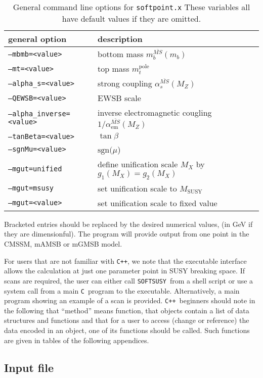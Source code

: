 \documentclass[]{article}
\def\SOFTSUSY{{\tt SOFTSUSY}}
\def\code#1{\small{\tt #1}\normalsize}
\begin{document}
\begin{table}[tbh]
  \centering
  \begin{tabular}{ll}
    general option & description \\
    \hline
    \code{--mbmb=<value>} & bottom mass $m_b^{\overline{MS}}(m_b)$ \\
    \code{--mt=<value>} & top mass $m_t^\text{pole}$ \\
    \code{--alpha\_s=<value>} & strong coupling $\alpha_s^{\overline{MS}}(M_Z)$ \\
    \code{--QEWSB=<value>} & EWSB scale \\
    \code{--alpha\_inverse=<value>} & inverse electromagnetic cougling
    $1/\alpha^{\overline{MS}}_\text{em}(M_Z)$ \\
    \code{--tanBeta=<value>} & $\tan\beta$ \\
    \code{--sgnMu=<value>} & $\text{sgn}(\mu$) \\
    \code{--mgut=unified} & define unification scale $M_X$ by $g_1(M_X)=g_2(M_X)$ \\
    \code{--mgut=msusy} & set unification scale to $M_\text{SUSY}$ \\
    \code{--mgut=<value>} & set unification scale to fixed value \\
    \hline
  \end{tabular}
  \caption{General command line options for \code{softpoint.x} These variables
    all have  default values if they are omitted.}
  \label{tab:general-cmd-line-options}
\end{table}
%
Bracketed entries should be replaced by the desired numerical values, (in GeV
if they are dimensionful). The program will provide output from one point in
the CMSSM, mAMSB or mGMSB model. 


For users that are not familiar with \code{C++}, we note that the executable
interface allows the calculation at just one parameter point in SUSY breaking 
space. If scans are required, the user can either call \SOFTSUSY~from a
shell script or use a system call from a main \code{C}~program to the
executable. Alternatively, a main program showing an example of a scan is
provided. \code{C++}~beginners should note in
the following that ``method'' means function, that objects contain a list of
data structures and functions and that for a user to access (change
or reference) the data encoded in an object, one of its functions should be
called. Such functions are given in tables of the following appendices.

\subsection{Input file \label{sec:input}}
\end{document}
